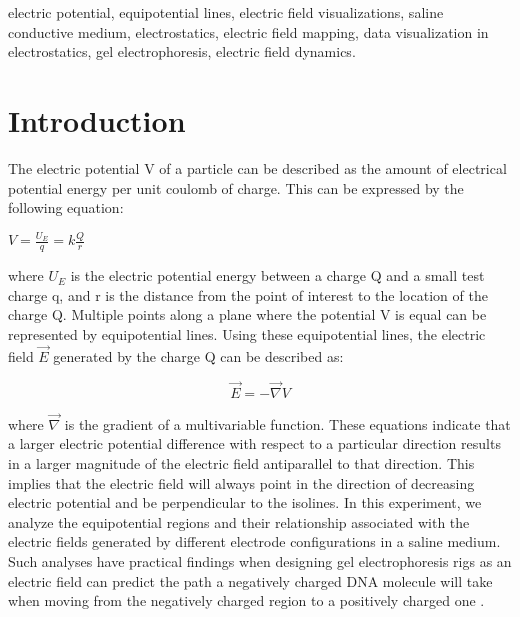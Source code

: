 \documentclass[conference]{IEEEtran}
\begin{document}
\begin{IEEEkeywords}
electric potential, equipotential lines, electric field visualizations, saline conductive medium, electrostatics, electric field mapping, data visualization in electrostatics, gel electrophoresis, electric field dynamics.
\end{IEEEkeywords}

\section{Introduction}
The electric potential V of a particle can be described as the amount of electrical potential energy per unit coulomb of charge. This can be expressed by the following equation:

\begin{center}
$V = \frac{U_E}{q} = k \frac{Q}{r}$
\end{center}

\noindent where $U_E$ is the electric potential energy between a charge Q and a small test charge q, and r is the distance from the point of interest to the location of the charge Q. Multiple points along a plane where the potential V is equal can be represented by equipotential lines. Using these equipotential lines, the electric field $\vec{E}$ generated by the charge Q can be described as:


\begin{equation}
\vec{E} = -\vec{\nabla}{V}    
\end{equation}

\noindent where $\vec{\nabla}$ is the gradient of a multivariable function. These equations indicate that a larger electric potential difference with respect to a particular direction results in a larger magnitude of the electric field antiparallel to that direction. This implies that the electric field will always point in the direction of decreasing electric potential and be perpendicular to the isolines. In this experiment, we analyze the equipotential regions and their relationship associated with the electric fields generated by different electrode configurations in a saline medium. Such analyses have practical findings when designing gel electrophoresis rigs as an electric field can predict the path a negatively charged DNA molecule will take when moving from the negatively charged region to a positively charged one \cite{b1}. 
\end{document}
